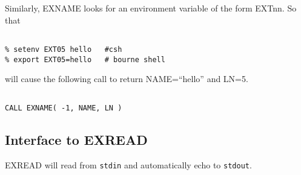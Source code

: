 Similarly,
EXNAME looks for an environment variable of the form
EXTnn.
So that
\begin{verbatim}

% setenv EXT05 hello   #csh
% export EXT05=hello   # bourne shell

\end{verbatim}
will cause the following call to return NAME=``hello'' and LN=5.
\begin{verbatim}

CALL EXNAME( -1, NAME, LN )
\end{verbatim}

\subsection{Interface to EXREAD}
EXREAD will read from \verb+stdin+ and automatically echo to \verb+stdout+.

\cleardoublepage
